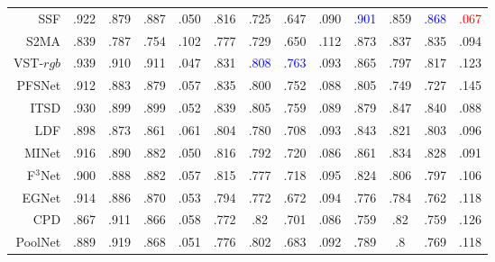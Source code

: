 \begin{table}[!ht]
{\begin{tabular}{rcccccccccccc}
			SSF     \upcite{zhang2020select} 
			& .922 & .879 & .887 & .050 
			& .816 & .725 & .647 & .090 
			& \textcolor{blue}{.901} & .859 & \textcolor{blue}{.868} & {\textcolor{red}{.067}} \\ 
			
			S2MA    \upcite{liu2020learning} 
			& .839 & .787 & .754 & 	.102 
			& .777 & .729 & .650 & .112 
			& .873 & .837 &	.835 & .094 \\
			
			
			\midrule[1pt] 
			
			
			VST-$rgb$ \upcite{liu2021visual} 
			& .939 & .910 & .911 & .047
			& .831 & \textcolor{blue}{.808} & \textcolor{blue}{.763} & .093 
			& .865 & .797 & .817 & .123 
			\\ 
			
			PFSNet \upcite{ma2021pyramidal}
			& .912 & .883 & .879 & .057 
			& .835 & .800 & .752 & .088 
			& .805 & .749 & .727 & .145 
			\\ 
			
			
			ITSD \upcite{zhou2020interactive} 
			& .930 & .899 & .899 & .052 
			& .839 & .805 & .759 & .089 
			& .879 & .847 & .840 & .088 
			\\ 
			
			
			
			LDF \upcite{wei2020label} 
			& .898 & .873 & .861 & .061 
			& .804 & .780 & .708 & .093 
			& .843 & .821 & .803 & .096 
			\\ 
			
			
			MINet \upcite{pang2020multi} 
			& .916 & .890 & .882 & .050 
			& .816 & .792 & .720 & .086 
			& .861 & .834 & .828 & .091 
			\\ 
			
			F$^{3}$Net  \upcite{wei2020f3net}
			& .900 & .888 & .882 & .057 
			& .815 & .777 & .718 & .095 
			& .824 & .806 & .797 & .106 
			\\ 
			
			
			EGNet   \upcite{zhao2019egnet}
			& .914 & .886 & .870 & .053 
			& .794 & .772 & .672 & .094 
			& .776 & .784 & .762 & .118 
			\\ 
			
			CPD  \upcite{wu2019cascaded}
			& .867 & .911 & .866 & .058 
			& .772 & .82  & .701 & .086 
			& .759 & .82  & .759 & .126 \\
			
			PoolNet \upcite{liu2019simple}
			& .889 & .919 & .868 & .051 
			& .776 & .802 & .683 & .092 
			& .789 & .8   & .769 & .118 \\
			

\end{tabular}}
\end{table}
